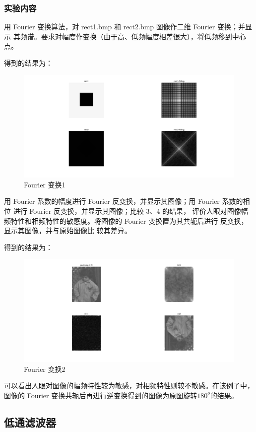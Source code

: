 \documentclass{ctexart}
\begin{document}
\subsubsection{\hei 实验内容}
用 Fourier 变换算法，对 rect1.bmp 和 rect2.bmp 图像作二维 Fourier 变换；并显示
其频谱。要求对幅度作变换（由于高、低频幅度相差很大），将低频移到中心点。
\par 得到的结果为：
\begin{figure}[H]
    \centering
    \includegraphics[scale=0.35]{4_1.png}
    \caption{Fourier 变换1}
\end{figure}
用 Fourier 系数的幅度进行 Fourier 反变换，并显示其图像；用 Fourier 系数的相位
进行 Fourier 反变换，并显示其图像；比较 3、4 的结果，
评价人眼对图像幅频特性和相频特性的敏感度。将图像的 Fourier 变换置为其共轭后进行
反变换，显示其图像，并与原始图像比
较其差异。
\par 得到的结果为：
\begin{figure}[H]
    \centering
    \includegraphics[scale=0.35]{4_2-4.png}
    \caption{Fourier 变换2}
\end{figure}
\par 可以看出人眼对图像的幅频特性较为敏感，对相频特性则较不敏感。在该例子中，图像的 Fourier 变换共轭后再进行逆变换得到的图像为原图旋转$180^o$的结果。
\subsection{\hei 低通滤波器}
\end{document}
